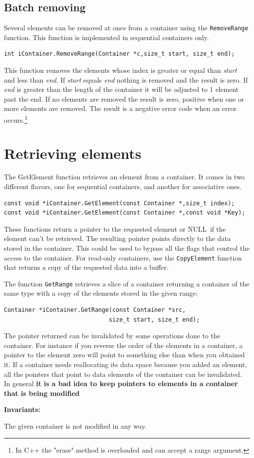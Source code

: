 \documentclass[12pt,a4paper,openany]{memoir} %
\newif\iftth
\newcommand{\Const}{
{\par\noindent \textbf{Invariants:}\noindent}
}
\newcommand{\Null}{{\iftth \ NULL \else \footnotesize NULL\  \fi}}
\begin{document}
\subsection{Batch removing}
Several elements can be removed at once from a container using the \texttt{RemoveRange} function. This function is implemented in sequential
containers only.
\begin{verbatim}
int iContainer.RemoveRange(Container *c,size_t start, size_t end);
\end{verbatim}
This function removes the elements whose index is greater or equal than \textsl{start} and less than \textsl{end}. If \textsl{start} equals \textsl{end}
nothing is removed and the result is zero. If \textsl{end} is greater than the length of the container it will be adjusted to 1 element past the
end. If no elements are removed the result is zero, positive when one or more elements are removed. The result is a negative error code when an
error occurs.\footnote{In C++ the "erase" method is overloaded and can accept a range argument.}

\section{Retrieving elements}
The GetElement function retrieves an element from a container. It comes in two different flavors, one for sequential containers, and another for associative ones.
\begin{verbatim}
const void *iContainer.GetElement(const Container *,size_t index);
const void *iContainer.GetElement(const Container *,const void *Key);
\end{verbatim}
These functions return a pointer to the requested element or \Null if the element can't be retrieved. The resulting pointer points directly to the data 
stored in the container. This could be used to bypass all the flags that control the access to the container. For read-only containers, use the 
\texttt{CopyElement} function that returns a copy of the requested data into a buffer.

The function \texttt{GetRange} retrieves a slice of a container returning a container of the same type with a copy of the elements stored in the
given range: 
\begin{verbatim}
Container *iContainer.GetRange(const Container *src,
                              size_t start, size_t end);
\end{verbatim}

The pointer returned can be invalidated by some operations done to the container. For instance if you reverse the order of the elements in a container, 
a pointer to the element zero will point to something else than when you obtained it. If a container needs reallocating its data space because you
added an element, all the pointers that point to data elements of the container can be invalidated. In general \textbf{it is a bad idea to keep pointers 
to elements in a container that is being modified}
\Const The given container is not modified in any way.
\end{document}
